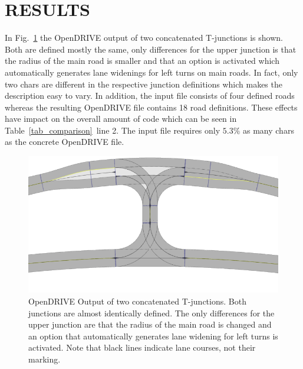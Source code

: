 \documentclass[a4paper, 10pt, conference]{ieeeconf}      %
\begin{document}
\section{RESULTS}
In Fig.~\ref{fig_res3_2} the OpenDRIVE output of two concatenated T-junctions is shown. Both are defined mostly the same, only differences for the upper junction is that the radius of the main road is smaller and that an option is activated which automatically generates lane widenings for left turns on main roads. In fact, only two chars are different in the respective junction definitions which makes the description easy to vary. In addition, the input file consists of four defined roads whereas the resulting OpenDRIVE file contains 18 road definitions. These effects have impact on the overall amount of code which can be seen in Table~\ref{tab_comparison}~line 2. The input file requires only $5.3\%$ as many chars as the concrete OpenDRIVE file.
\begin{figure}[thpb]
	\includegraphics[width=\columnwidth]{fig/res3_2.png}
	\caption{OpenDRIVE Output of two concatenated T-junctions. Both junctions are almost identically defined. The only differences for the upper junction are that the radius of the main road is changed and an option that automatically generates lane widening for left turns is activated. Note that black lines indicate lane courses, not their marking.}
	\label{fig_res3_2}
\end{figure}
\end{document}
